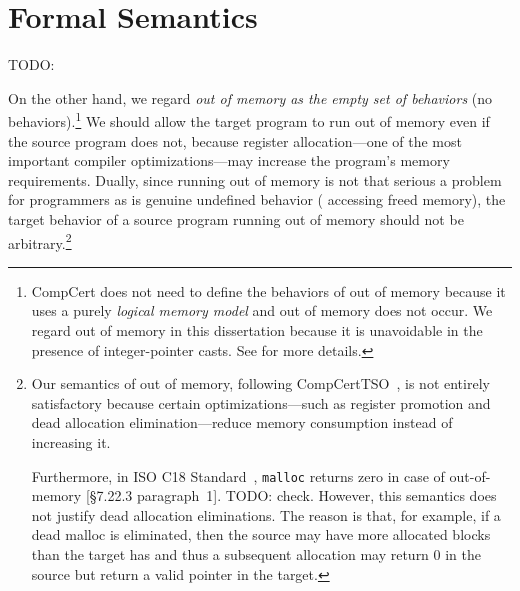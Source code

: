 \section{Formal Semantics}
\label{sec:intptrcast:formal-semantics}

TODO:

On the other hand, we regard \emph{out of memory as the empty set of behaviors} (\ie no
behaviors).\footnote{CompCert does not need to define the behaviors of out of memory because it uses
  a purely \emph{logical memory model} and out of memory does not occur.  We regard out of memory in
  this dissertation because it is unavoidable in the presence of integer-pointer casts.  See
   for more details.}  We should allow the target program to run out of memory
even if the source program does not, because register allocation---one of the most important
compiler optimizations---may increase the program's memory requirements.  Dually, since running out
of memory is not that serious a problem for programmers as is genuine undefined behavior (\eg
accessing freed memory), the target behavior of a source program running out of memory should not be
arbitrary.\footnote{Our semantics of out of memory, following
  CompCertTSO~\cite{vsevvcik2013compcerttso}, is not entirely satisfactory because certain
  optimizations---such as register promotion and dead allocation elimination---reduce memory
  consumption instead of increasing it.

  Furthermore, in ISO C18 Standard~\cite{iso2018iec}, \texttt{malloc} returns zero in case of
  out-of-memory [\S7.22.3 paragraph~1].  TODO: check.  However, this semantics does not justify dead
  allocation eliminations.  The reason is that, for example, if a dead malloc is eliminated, then
  the source may have more allocated blocks than the target has and thus a subsequent allocation may
  return 0 in the source but return a valid pointer in the target.}


